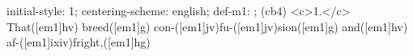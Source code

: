 initial-style: 1;
centering-scheme: english;
def-m1: \grealign;
(cb4) <c>1.</c> That([em1]hv) breed([em1]g) con-([em1]jv)fu-([em1]jv)sion([em1]g) and([em1]hv) af-([em1]ixiv)fright,([em1]hg)